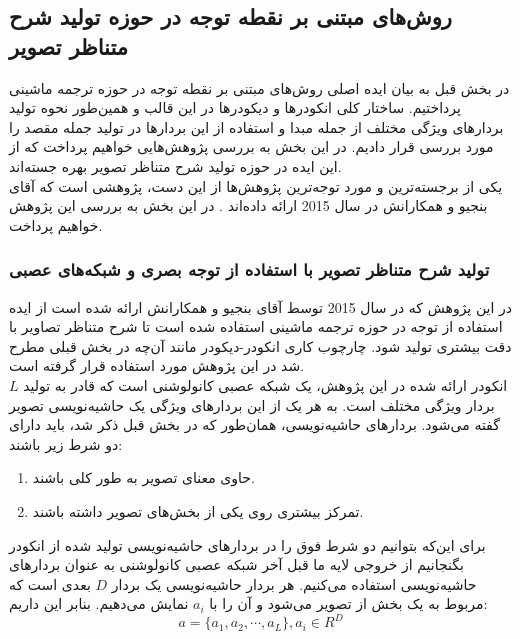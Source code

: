 \subsection{روش‌های مبتنی بر نقطه توجه در حوزه تولید شرح متناظر تصویر}
در بخش قبل به بیان ایده اصلی روش‌های مبتنی بر نقطه توجه در حوزه ترجمه ماشینی پرداختیم. ساختار کلی انکودرها و دیکودرها در این قالب و همین‌طور نحوه تولید بردارهای ویژگی مختلف از جمله مبدا و استفاده از این بردارها در تولید جمله مقصد را مورد بررسی قرار دادیم. در این بخش  به بررسی پژوهش‌هایی خواهیم پرداخت که از این ایده در حوزه تولید شرح متناظر تصویر بهره‌ جسته‌اند.
\\
یکی از برجسته‌ترین و مورد توجه‌ترین پژوهش‌ها از این دست، پژوهشی است که آقای بنجیو و همکارانش در سال 2015 ارائه داده‌اند
\cite{xu2015show}.
در این بخش به بررسی این پژوهش خواهیم پرداخت.

\subsubsection[تولید شرح متناظر تصویر با استفاده از توجه بصری و شبکه‌های عصبی]{تولید شرح متناظر تصویر با استفاده از توجه بصری و شبکه‌های عصبی \cite{xu2015show}}
	
در این پژوهش که در سال 2015 توسط آقای بنجیو و همکارانش ارائه شده است از ایده استفاده از توجه در حوزه ترجمه ماشینی استفاده شده است تا شرح متناظر تصاویر با دقت بیشتری تولید شود. چارچوب کاری انکودر-دیکودر مانند آن‌چه در بخش قبلی مطرح شد در این پژوهش مورد استفاده قرار گرفته است.
\\
انکودر ارائه شده در این پژوهش، یک شبکه عصبی کانولوشنی است که قادر به تولید $L$ بردار ویژگی مختلف است. به هر یک از این بردارهای ویژگی یک حاشیه‌نویسی تصویر گفته می‌شود. بردارهای حاشیه‌نویسی، همان‌طور که در بخش قبل ذکر شد، باید دارای دو شرط زیر باشند:
\begin{enumerate}
\item حاوی معنای تصویر به طور کلی باشند.
\item تمرکز بیشتری روی یکی از بخش‌های تصویر داشته باشند.
\end{enumerate}
برای این‌که بتوانیم دو شرط فوق را در بردارهای حاشیه‌نویسی تولید شده از انکودر بگنجانیم از خروجی لایه ما قبل آخر شبکه عصبی کانولوشنی به عنوان بردارهای حاشیه‌نویسی استفاده می‌کنیم. هر بردار حاشیه‌نویسی یک بردار $D$ بعدی است که مربوط به یک بخش از تصویر می‌شود و آن را با $a_i$ نمایش می‌دهیم. بنابر این داریم:
\begin{equation}
a = \{a_1, a_2, \cdots, a_L\}, a_i \in R^D
\end{equation}


